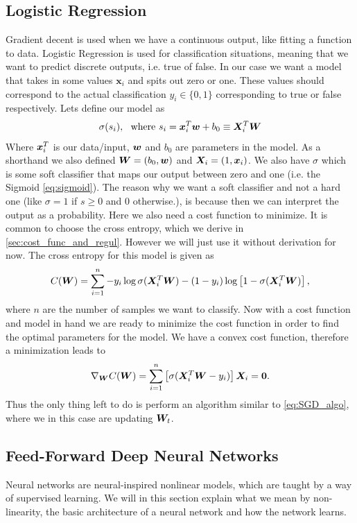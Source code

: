 \documentclass[12pt]{extarticle}
\begin{document}
\subsection{Logistic Regression}
Gradient decent is used when we have a continuous output, like fitting a function to data. Logistic Regression is used for classification situations, meaning that we want to predict discrete outputs, i.e. true of false. In our case we want a model that takes in some values $\mathbf{x}_i$ and spits out zero or one. These values should correspond to the actual classification $y_i\in\{0,1\}$ corresponding to true or false respectively. Lets define our model as
\begin{align}
	\sigma(s_i), \ \ \text{where }s_i = \boldsymbol x_i^T \boldsymbol w + b_0 \equiv \boldsymbol X_i^T \boldsymbol W
\end{align}
Where $\boldsymbol x_i^T$ is our data/input, $\boldsymbol w$ and $b_0$ are parameters in the model. As a shorthand we also defined $\boldsymbol W = (b_0, \boldsymbol w)$ and $\boldsymbol X_i = (1, \boldsymbol x_i)$. We also have $\sigma$ which is some soft classifier that maps our output between zero and one (i.e. the Sigmoid \eqref{eq:sigmoid}). The reason why we want a soft classifier and not a hard one (like $\sigma = 1$ if $s\geq0$ and $0$ otherwise.), is because then we can interpret the output as a probability. Here we also need a cost function to minimize. It is common to choose the cross entropy, which we derive in \ref{sec:cost_func_and_regul}. However we will just use it without derivation for now. The cross entropy for this model is given as
\begin{align}
	C(\boldsymbol W) = \sum_{i = 1}^{n} -y_i \log\sigma(\boldsymbol X_i^T \boldsymbol W) - (1 - y_i)\log\left[1 - \sigma(\boldsymbol X^T_i \boldsymbol W)\right],
\end{align}
where $n$ are the number of samples we want to classify. Now with a cost function and model in hand we are ready to minimize the cost function in order to find the optimal parameters for the model. We have a convex cost function, therefore a minimization leads to
\begin{align}
	\nabla_{\boldsymbol W} C(\boldsymbol W) = \sum_{i = 1}^n \left[\sigma(\boldsymbol X_i^T \boldsymbol W - y_i)\right]\boldsymbol X_i = \boldsymbol 0.
\end{align}
Thus the only thing left to do is perform an algorithm similar to \ref{eq:SGD_algo}, where we in this case are updating $\boldsymbol W_t$.

\subsection{Feed-Forward Deep Neural Networks}
Neural networks are neural-inspired nonlinear models, which are taught by a way of supervised learning. We will in this section explain what we mean by non-linearity, the basic architecture of a neural network and how the network learns. 
\end{document}
